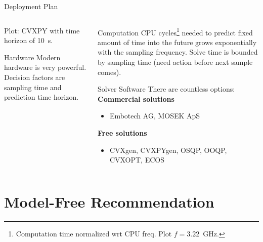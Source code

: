 \documentclass[xetex, smaller, aspectratio=43]{beamer}
\begin{document}
\begin{frame}[fragile]{Deployment Plan}
\begin{columns}[T]
\begin{column}{.55\linewidth}
      {\small
        Plot: CVXPY with time horizon of 10~s.
      }
      \begin{alertblock}{Hardware}
        \small
        Modern hardware is very powerful.
        Decision factors are sampling time and prediction time horizon.
      \end{alertblock}
    \end{column}
    \begin{column}{.45\linewidth}
      \begin{block}{Computation}
        \small
        CPU cycles\footnote{Computation time normalized wrt CPU freq. Plot $f =
        3.22$~GHz.} needed to predict fixed amount of time into the future grows
        exponentially with the sampling frequency. Solve time is bounded
        by sampling time (need action before next sample comes).
      \end{block}
      \begin{exampleblock}{Solver Software}
        \small
        There are countless options: \\[.2em]
        \textbf{Commercial solutions}
        \begin{itemize}
          \item Embotech AG, MOSEK ApS
        \end{itemize}
        \textbf{Free solutions}
        \begin{itemize}
          \item CVXgen, CVXPYgen, OSQP, OOQP, CVXOPT, ECOS
        \end{itemize}
      \end{exampleblock}
    \end{column}
  \end{columns}
\end{frame}

\section{Model-Free Recommendation}

\iffalse
\begin{frame}{Model-Free Recommendation}
  \begin{columns}
    \begin{column}{.5\linewidth}
      \begin{alertblock}{Model Uncertainty}
        Linearised model is very inaccurate in $x$ and $\theta$!
      \end{alertblock}
    \end{column}
    \begin{column}{.5\linewidth}
    \end{column}
  \end{columns}
\end{frame}
\fi
\end{document}
